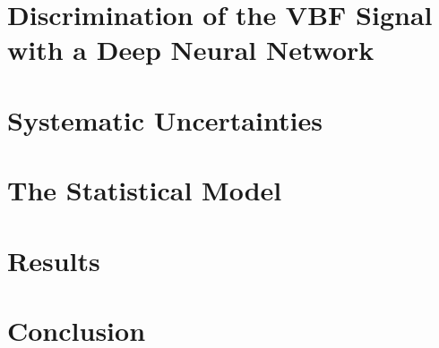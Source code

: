 \section{Discrimination of the VBF Signal with a Deep Neural Network}
\label{sec:dnn}



\section{Systematic Uncertainties}
\label{sec:systematics}



\section{The Statistical Model}
\label{sec:stats-analysis}



\section{Results}
\label{sec:hww-results}


\section{Conclusion}
\label{sec:conclusion}
